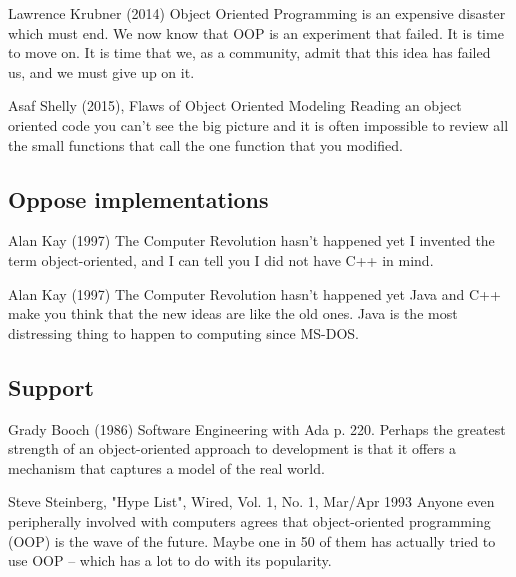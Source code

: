 \documentclass[12pt]{KodeBookAr}
\begin{document}
\begin{kodequote}{Lawrence Krubner (2014)}
	Object Oriented Programming is an expensive disaster which must end. 
	We now know that OOP is an experiment that failed. It is time to move on. It is time that we, as a community, admit that this idea has failed us, and we must give up on it.
\end{kodequote}

\begin{kodequote}{Asaf Shelly (2015), Flaws of Object Oriented Modeling}
	Reading an object oriented code you can't see the big picture and it is often impossible to review all the small functions that call the one function that you modified.
\end{kodequote}


\subsection{Oppose implementations}

\begin{kodequote}{Alan Kay (1997) The Computer Revolution hasn't happened yet}
	I invented the term object-oriented, and I can tell you I did not have C++ in mind.
\end{kodequote}

\begin{kodequote}{Alan Kay (1997) The Computer Revolution hasn't happened yet}
	Java and C++ make you think that the new ideas are like the old ones. Java is the most distressing thing to happen to computing since MS-DOS.
\end{kodequote}

\subsection{Support}

\begin{kodequote}{Grady Booch (1986) Software Engineering with Ada p. 220. }
	Perhaps the greatest strength of an object-oriented approach to development is that it offers a mechanism that captures a model of the real world.
\end{kodequote}


\begin{kodequote}{Steve Steinberg, "Hype List", Wired, Vol. 1, No. 1, Mar/Apr 1993}
	Anyone even peripherally involved with computers agrees that object-oriented programming (OOP) is the wave of the future. Maybe one in 50 of them has actually tried to use OOP – which has a lot to do with its popularity.
\end{kodequote}
\end{document}
